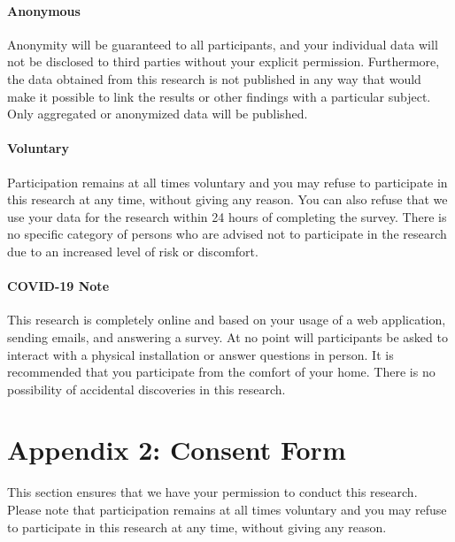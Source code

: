 \documentclass{article}
\begin{document}
\paragraph{Anonymous}

Anonymity will be guaranteed to all participants, and your individual data will not be disclosed to third parties without your explicit permission. Furthermore, the data obtained from this research is not published in any way that would make it possible to link the results or other findings with a particular subject. Only aggregated or anonymized data will be published.

\paragraph{Voluntary}

Participation remains at all times voluntary and you may refuse to participate in this research at any time, without giving any reason. You can also refuse that we use your data for the research within 24 hours of completing the survey. There is no specific category of persons who are advised not to participate in the research due to an increased level of risk or discomfort.

\paragraph{COVID-19 Note}

This research is completely online and based on your usage of a web application, sending emails, and answering a survey. At no point will participants be asked to interact with a physical installation or answer questions in person. It is recommended that you participate from the comfort of your home. There is no possibility of accidental discoveries in this research.

\newpage

\section*{Appendix 2: Consent Form}

This section ensures that we have your permission to conduct this research. Please note that participation remains at all times voluntary and you may refuse to participate in this research at any time, without giving any reason.
\end{document}
